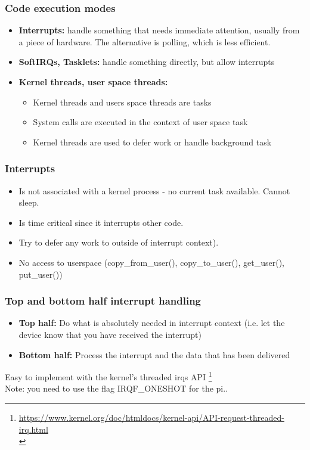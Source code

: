 \documentclass{beamer}
\begin{document}
\begin{frame}
\frametitle{Code execution modes}
\begin{itemize}
	\item \textbf{Interrupts:} handle something that needs immediate attention, usually from a piece of hardware. The alternative is polling, which is less efficient.
	\item \textbf{SoftIRQs, Tasklets:} handle something directly, but allow interrupts
	\item \textbf{Kernel threads, user space threads:}
	\begin{itemize}
		\item Kernel threads and users space threads are tasks
		\item System calls are executed in the context of user space task
		\item Kernel threads are used to defer work or handle background task
	\end{itemize}
\end{itemize}
\end{frame}

\begin{frame}
\frametitle{Interrupts}
\begin{itemize}
	\item Is not associated with a kernel process - no current task available.
Cannot sleep.
	\item Is time critical since it interrupts other code.
	\item Try to defer any work to outside of interrupt context).
	\item No access to userspace (copy\_from\_user(), copy\_to\_user(), get\_user(), put\_user())
\end{itemize}
\end{frame}

\begin{frame}
\frametitle{Top and bottom half interrupt handling}
\begin{itemize}
	\item \textbf{Top half:} Do what is absolutely needed in interrupt context (i.e. let the device know that you have received the interrupt)
	\item \textbf{Bottom half:} Process the interrupt and the data that has been delivered
\end{itemize}

Easy to implement with the kernel’s threaded irqs API \footnote{\url{https://www.kernel.org/doc/htmldocs/kernel-api/API-request-threaded-irq.html}\\} \\
Note: you need to use the flag IRQF\_ONESHOT for the pi..

\end{frame}
\end{document}
